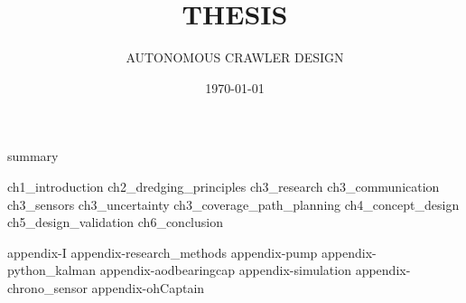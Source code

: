 \documentclass[english, businessunit=mti, status=final]{IHCreport}
\title{THESIS}
\subtitle{AUTONOMOUS CRAWLER DESIGN}
\date{\today}
\begin{document}

%
\begin{front}[]
 {summary}
\end{front}

\begin{main}
 {ch1_introduction}
 {ch2_dredging_principles}
 {ch3_research}
 {ch3_communication}
 {ch3_sensors}
 {ch3_uncertainty}
 {ch3_coverage_path_planning}
 {ch4_concept_design}
 {ch5_design_validation}
 {ch6_conclusion}
\end{main}

\begin{back}[]
 \printglossaries{}
 \printbibliography[title={BIBLIOGRAPHY}]
 \begin{app}
  {appendix-I}
  {appendix-research_methods}
  {appendix-pump}
  {appendix-python_kalman}
  {appendix-aodbearingcap}
  {appendix-simulation}
  {appendix-chrono_sensor}
  {appendix-ohCaptain}
 \end{app}
\end{back}
\end{document}
